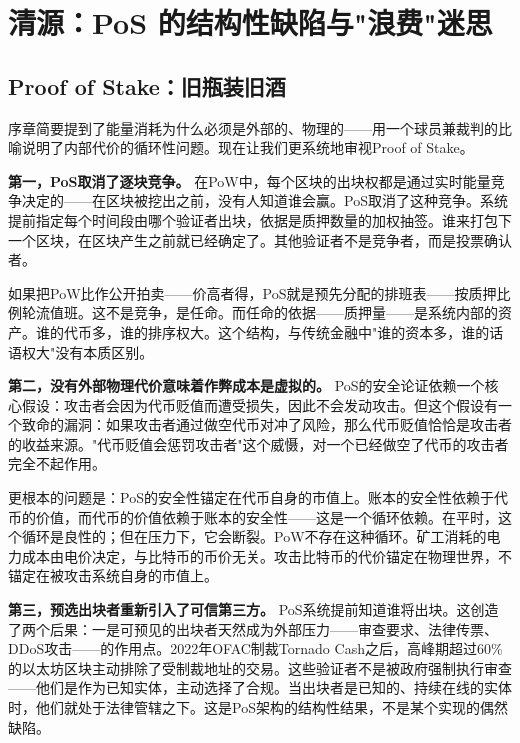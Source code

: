 \documentclass[a4paper,12pt,openany]{ctexbook}
\begin{document}
\section*{清源：PoS 的结构性缺陷与"浪费"迷思}



\subsection*{Proof of Stake：旧瓶装旧酒}


序章简要提到了能量消耗为什么必须是外部的、物理的——用一个球员兼裁判的比喻说明了内部代价的循环性问题。现在让我们更系统地审视Proof of Stake。

\textbf{第一，PoS取消了逐块竞争。} 在PoW中，每个区块的出块权都是通过实时能量竞争决定的——在区块被挖出之前，没有人知道谁会赢。PoS取消了这种竞争。系统提前指定每个时间段由哪个验证者出块，依据是质押数量的加权抽签。谁来打包下一个区块，在区块产生之前就已经确定了。其他验证者不是竞争者，而是投票确认者。

如果把PoW比作公开拍卖——价高者得，PoS就是预先分配的排班表——按质押比例轮流值班。这不是竞争，是任命。而任命的依据——质押量——是系统内部的资产。谁的代币多，谁的排序权大。这个结构，与传统金融中"谁的资本多，谁的话语权大"没有本质区别。

\textbf{第二，没有外部物理代价意味着作弊成本是虚拟的。} PoS的安全论证依赖一个核心假设：攻击者会因为代币贬值而遭受损失，因此不会发动攻击。但这个假设有一个致命的漏洞：如果攻击者通过做空代币对冲了风险，那么代币贬值恰恰是攻击者的收益来源。"代币贬值会惩罚攻击者"这个威慑，对一个已经做空了代币的攻击者完全不起作用。

更根本的问题是：PoS的安全性锚定在代币自身的市值上。账本的安全性依赖于代币的价值，而代币的价值依赖于账本的安全性——这是一个循环依赖。在平时，这个循环是良性的；但在压力下，它会断裂。PoW不存在这种循环。矿工消耗的电力成本由电价决定，与比特币的币价无关。攻击比特币的代价锚定在物理世界，不锚定在被攻击系统自身的市值上。

\textbf{第三，预选出块者重新引入了可信第三方。} PoS系统提前知道谁将出块。这创造了两个后果：一是可预见的出块者天然成为外部压力——审查要求、法律传票、DDoS攻击——的作用点。2022年OFAC制裁Tornado Cash之后，高峰期超过60\%的以太坊区块主动排除了受制裁地址的交易。这些验证者不是被政府强制执行审查——他们是作为已知实体，主动选择了合规。当出块者是已知的、持续在线的实体时，他们就处于法律管辖之下。这是PoS架构的结构性结果，不是某个实现的偶然缺陷。
\end{document}
